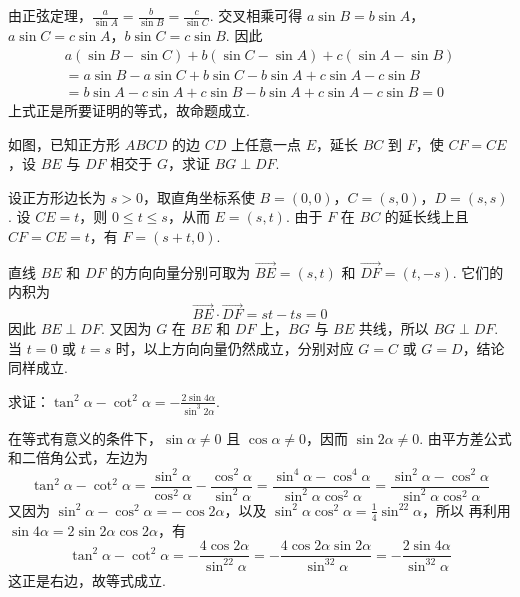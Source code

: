 \begin{solution}
由正弦定理，\(\frac{a}{\sin A}=\frac{b}{\sin B}=\frac{c}{\sin C}\). 交叉相乘可得
\(a\sin B=b\sin A\)，\(a\sin C=c\sin A\)，\(b\sin C=c\sin B\). 因此
\[
\begin{gathered}
a\left( \sin B-\sin C \right)+b\left( \sin C-\sin A \right)+c\left( \sin A-\sin B \right) \\
=a\sin B-a\sin C+b\sin C-b\sin A+c\sin A-c\sin B \\
=b\sin A-c\sin A+c\sin B-b\sin A+c\sin A-c\sin B=0
\end{gathered}
\]
上式正是所要证明的等式，故命题成立.
\end{solution}

\begin{problem}
如图，已知正方形 \(ABCD\) 的边 \(CD\) 上任意一点 \(E\)，延长 \(BC\) 到 \(F\)，使 \( CF=CE \)，设 \(BE\) 与 \(DF\) 相交于 \(G\)，求证 \( BG \perp DF \).

\end{problem}

\begin{solution}
设正方形边长为 \(s>0\)，取直角坐标系使
\(B=(0,0)\)，\(C=(s,0)\)，\(D=(s,s)\). 设 \(CE=t\)，则 \(0\leq t\leq s\)，从而
\(E=(s,t)\). 由于 \(F\) 在 \(BC\) 的延长线上且 \(CF=CE=t\)，有 \(F=(s+t,0)\).

直线 \(BE\) 和 \(DF\) 的方向向量分别可取为
\(\overrightarrow{BE}=(s,t)\) 和 \(\overrightarrow{DF}=(t,-s)\). 它们的内积为
\[
\overrightarrow{BE}\mathbin{\cdot}\overrightarrow{DF}=st-ts=0
\]
因此 \(BE\perp DF\). 又因为 \(G\) 在 \(BE\) 和 \(DF\) 上，\(BG\) 与 \(BE\) 共线，所以 \(BG\perp DF\). 当 \(t=0\) 或 \(t=s\) 时，以上方向向量仍然成立，分别对应 \(G=C\) 或 \(G=D\)，结论同样成立.
\end{solution}

\begin{problem}
求证：\( \tan^2\alpha-\cot^2\alpha=-\frac{2\sin 4\alpha}{\sin^3 2\alpha} \).
\end{problem}

\begin{solution}
在等式有意义的条件下，\(\sin\alpha\ne0\) 且 \(\cos\alpha\ne0\)，因而 \(\sin2\alpha\ne0\). 由平方差公式和二倍角公式，左边为
\[
\tan^2\alpha-\cot^2\alpha
=\frac{\sin^2\alpha}{\cos^2\alpha}-\frac{\cos^2\alpha}{\sin^2\alpha}
=\frac{\sin^4\alpha-\cos^4\alpha}{\sin^2\alpha\cos^2\alpha}
=\frac{\sin^2\alpha-\cos^2\alpha}{\sin^2\alpha\cos^2\alpha}
\]
又因为 \(\sin^2\alpha-\cos^2\alpha=-\cos2\alpha\)，以及
\(\sin^2\alpha\cos^2\alpha=\frac14\sin^22\alpha\)，所以
再利用 \(\sin4\alpha=2\sin2\alpha\cos2\alpha\)，有
\[
\tan^2\alpha-\cot^2\alpha
=-\frac{4\cos2\alpha}{\sin^22\alpha}
=-\frac{4\cos2\alpha\sin2\alpha}{\sin^32\alpha}
=-\frac{2\sin4\alpha}{\sin^32\alpha}
\]
这正是右边，故等式成立.
\end{solution}

